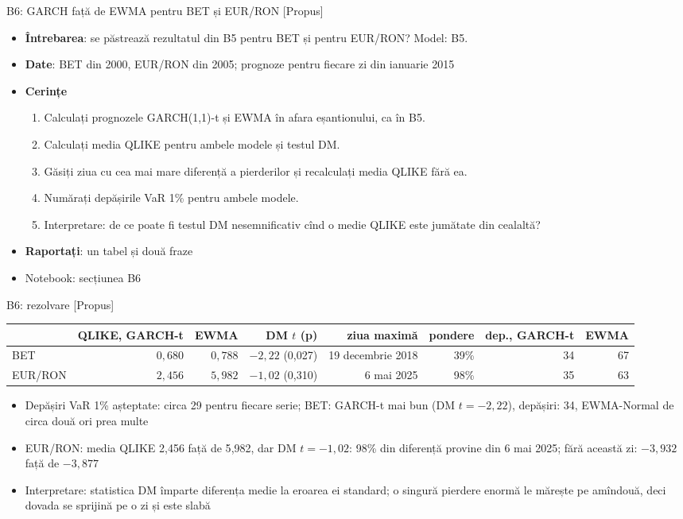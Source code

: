 \begin{frame}{B6: GARCH față de EWMA pentru BET și EUR/RON [Propus]}
\itemsize{\footnotesize}
\begin{itemize}
\item \textbf{Întrebarea}: se păstrează rezultatul din B5 pentru BET și pentru EUR/RON? Model: B5.
\item \textbf{Date}: BET din 2000, EUR/RON din 2005; prognoze pentru fiecare zi din ianuarie 2015
\item \textbf{Cerințe}
\begin{enumerate}
    \item Calculați prognozele GARCH(1,1)-t și EWMA în afara eșantionului, ca în B5.
    \item Calculați media QLIKE pentru ambele modele și testul DM.
    \item Găsiți ziua cu cea mai mare diferență a pierderilor și recalculați media QLIKE fără ea.
    \item Numărați depășirile VaR 1\% pentru ambele modele.
    \item Interpretare: de ce poate fi testul DM nesemnificativ cînd o medie QLIKE este jumătate din cealaltă?
\end{enumerate}
\item \textbf{Raportați}: un tabel și două fraze
\item Notebook: secțiunea B6
\end{itemize}
\end{frame}

\ifsolutions
\begin{frame}{B6: rezolvare [Propus]}
\itemsize{\footnotesize}
\begin{center}
\scriptsize
\begin{tabular}{lrrrrrrr}
\toprule
& QLIKE, GARCH-t & EWMA & DM $t$ (p) & ziua maximă & pondere & dep., GARCH-t & EWMA \\
\midrule
BET & $0{,}680$ & $0{,}788$ & ${-2{,}22}$ (0{,}027) & 19 decembrie 2018 & 39\% & 34 & 67 \\
EUR/RON & $2{,}456$ & $5{,}982$ & ${-1{,}02}$ (0{,}310) & 6 mai 2025 & 98\% & 35 & 63 \\
\bottomrule
\end{tabular}
\end{center}
\begin{itemize}
    \item Depășiri VaR 1\% așteptate: circa 29 pentru fiecare serie; BET: GARCH-t mai bun (DM $t = -2{,}22$), depășiri: 34, EWMA-Normal de circa două ori prea multe
    \item EUR/RON: media QLIKE 2{,}456 față de 5{,}982, dar DM $t = -1{,}02$: 98\% din diferență provine din 6 mai 2025; fără această zi: $-3{,}932$ față de $-3{,}877$
    \item Interpretare: statistica DM împarte diferența medie la eroarea ei standard; o singură pierdere enormă le mărește pe amîndouă, deci dovada se sprijină pe o zi și este slabă
\end{itemize}
\end{frame}
\fi


